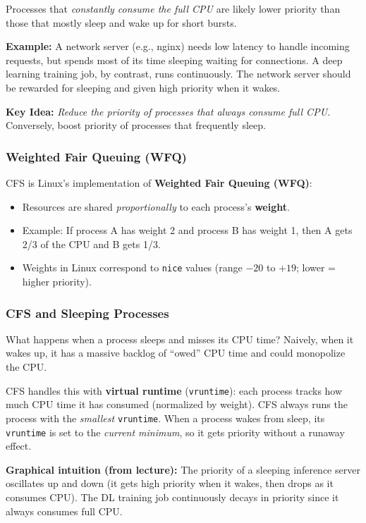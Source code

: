 \documentclass[11pt]{article}
\begin{document}
Processes that \emph{constantly consume the full CPU} are likely lower priority than those that mostly sleep and wake up for short bursts.

\textbf{Example:} A network server (e.g., nginx) needs low latency to handle incoming requests, but spends most of its time sleeping waiting for connections. A deep learning training job, by contrast, runs continuously. The network server should be rewarded for sleeping and given high priority when it wakes.

\textbf{Key Idea:} \emph{Reduce the priority of processes that always consume full CPU.} Conversely, boost priority of processes that frequently sleep.

\subsubsection*{Weighted Fair Queuing (WFQ)}

CFS is Linux's implementation of \textbf{Weighted Fair Queuing (WFQ)}:
\begin{itemize}
    \item Resources are shared \emph{proportionally} to each process's \textbf{weight}.
    \item Example: If process A has weight 2 and process B has weight 1, then A gets 2/3 of the CPU and B gets 1/3.
    \item Weights in Linux correspond to \texttt{nice} values (range $-20$ to $+19$; lower = higher priority).
\end{itemize}

\subsubsection*{CFS and Sleeping Processes}

What happens when a process sleeps and misses its CPU time? Naively, when it wakes up, it has a massive backlog of ``owed'' CPU time and could monopolize the CPU.

CFS handles this with \textbf{virtual runtime} (\texttt{vruntime}): each process tracks how much CPU time it has consumed (normalized by weight). CFS always runs the process with the \emph{smallest} \texttt{vruntime}. When a process wakes from sleep, its \texttt{vruntime} is set to the \emph{current minimum}, so it gets priority without a runaway effect.

\textbf{Graphical intuition (from lecture):} The priority of a sleeping inference server oscillates up and down (it gets high priority when it wakes, then drops as it consumes CPU). The DL training job continuously decays in priority since it always consumes full CPU.
\end{document}
